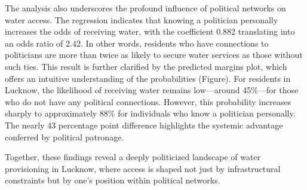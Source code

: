 The analysis also underscores the profound influence of political networks on water access. The regression indicates that knowing a politician personally increases the odds of receiving water, with the coefficient 0.882 translating into an odds ratio of 2.42. In other words, residents who have connections to politicians are more than twice as likely to secure water services as those without such ties. This result is further clarified by the predicted margins plot, which offers an intuitive understanding of the probabilities (Figure). For residents in Lucknow, the likelihood of receiving water remains low—around 45\%—for those who do not have any political connections. However, this probability increases sharply to approximately 88\% for individuals who know a politician personally. The nearly 43 percentage point difference highlights the systemic advantage conferred by political patronage.  

Together, these findings reveal a deeply politicized landscape of water provisioning in Lucknow, where access is shaped not just by infrastructural constraints but by one's position within political networks. 


